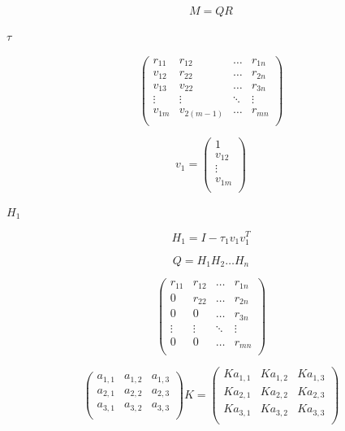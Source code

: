 \documentclass{article}
\begin{document}
\[      M = Q R
\]
\pagebreak

$\tau$
\pagebreak

\[  \begin{pmatrix}
  r_{11} & r_{12}     & \dots  & r_{1n} \\
  v_{12} & r_{22}     & \dots  & r_{2n} \\
  v_{13} & v_{22}     & \dots  & r_{3n} \\
  \vdots & \vdots     & \ddots & \vdots   \\
  v_{1m} & v_{2(m-1)} & \dots  & r_{mn} \\
  \end{pmatrix}
\]
\pagebreak

\[  v_1 = 
  \begin{pmatrix}
  1       \\
  v_{12}  \\
  \vdots  \\
  v_{1m}  \\
  \end{pmatrix}
\]
\pagebreak

$H_1$
\pagebreak

\[  H_1 = I - \tau_1 v_1 v_1^T
\]
\pagebreak

\[  Q = H_1 H_2 \dots H_n
\]
\pagebreak

\[  \begin{pmatrix}
  r_{11} & r_{12} & \dots  & r_{1n} \\
  0      & r_{22} & \dots  & r_{2n} \\
  0      & 0      & \dots  & r_{3n} \\
  \vdots & \vdots & \ddots & \vdots   \\
  0      & 0      & \dots  & r_{mn} \\
  \end{pmatrix}
\]
\pagebreak

\[\begin{pmatrix}
a_{1,1} & a_{1,2} & a_{1,3} \\
a_{2,1} & a_{2,2} & a_{2,3} \\
a_{3,1} & a_{3,2} & a_{3,3} \\
\end{pmatrix}
  K = 
\begin{pmatrix}
 K a_{1,1} & K a_{1,2} & K a_{1,3} \\
 K a_{2,1} & K a_{2,2} & K a_{2,3} \\
 K a_{3,1} & K a_{3,2} & K a_{3,3} \\
\end{pmatrix}
\]
\pagebreak
\end{document}
